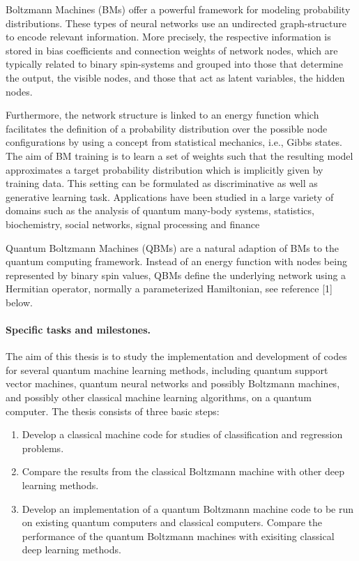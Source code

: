 \documentclass[%
oneside,                 %
final,                   %
10pt]{article}
\begin{document}
Boltzmann Machines (BMs) offer a powerful framework for modeling
probability distributions.  These types of neural networks use an
undirected graph-structure to encode relevant information.  More
precisely, the respective information is stored in bias coefficients
and connection weights of network nodes, which are typically related
to binary spin-systems and grouped into those that determine the
output, the visible nodes, and those that act as latent variables, the
hidden nodes.

Furthermore, the network structure is linked to an energy function
which facilitates the definition of a probability distribution over
the possible node configurations by using a concept from statistical
mechanics, i.e., Gibbs states.  The aim of BM training is to learn a
set of weights such that the resulting model approximates a target
probability distribution which is implicitly given by training data.
This setting can be formulated as discriminative as well as generative
learning task.  Applications have been studied in a large variety of
domains such as the analysis of quantum many-body systems, statistics,
biochemistry, social networks, signal processing and finance

Quantum Boltzmann Machines (QBMs) are a natural adaption of BMs to the
quantum computing framework. Instead of an energy function with nodes
being represented by binary spin values, QBMs define the underlying
network using a Hermitian operator, normally a parameterized Hamiltonian, see reference [1] below.

\paragraph{Specific tasks and milestones.}
The aim of this thesis is to study the implementation and development of codes for
several quantum machine learning methods, including quantum support vector machines, quantum neural networks and possibly  Boltzmann machines, and possibly other classical machine learning algorithms, on a quantum computer. The thesis consists of three basic steps:

\begin{enumerate}
\item Develop a classical machine code for studies of classification and regression problems.

\item Compare the results from the classical Boltzmann machine with other deep learning methods.

\item Develop an implementation of a quantum Boltzmann machine code to be run on existing quantum computers and classical computers. Compare the performance of the quantum Boltzmann machines with exisiting classical deep learning methods.
\end{enumerate}
\end{document}
